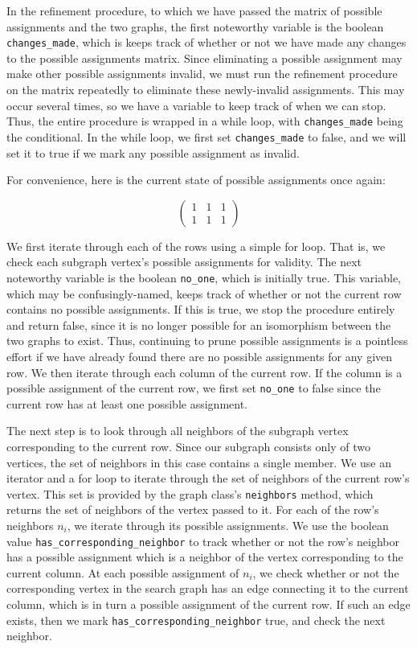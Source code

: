 \documentclass{article}
\begin{document}
  In the refinement procedure, to which we have passed the matrix of possible assignments and the two graphs, the first noteworthy variable is the boolean \texttt{changes\_made}, which is keeps track of whether or not we have made any changes to the possible assignments matrix. Since eliminating a possible assignment may make other possible assignments invalid, we must run the refinement procedure on the matrix repeatedly to eliminate these newly-invalid assignments. This may occur several times, so we have a variable to keep track of when we can stop. Thus, the entire procedure is wrapped in a while loop, with \texttt{changes\_made} being the conditional. In the while loop, we first set \texttt{changes\_made} to false, and we will set it to true if we mark any possible assignment as invalid.

  For convenience, here is the current state of possible assignments once again:

  \[ \begin{pmatrix}
      1 & 1 & 1 \\
      1 & 1 & 1
  \end{pmatrix} \]

  We first iterate through each of the rows using a simple for loop. That is, we check each subgraph vertex's possible assignments for validity. The next noteworthy variable is the boolean \texttt{no\_one}, which is initially true. This variable, which may be confusingly-named, keeps track of whether or not the current row contains no possible assignments. If this is true, we stop the procedure entirely and return false, since it is no longer possible for an isomorphism between the two graphs to exist. Thus, continuing to prune possible assignments is a pointless effort if we have already found there are no possible assignments for any given row. We then iterate through each column of the current row. If the column is a possible assignment of the current row, we first set \texttt{no\_one} to false since the current row has at least one possible assignment.

  The next step is to look through all neighbors of the subgraph vertex corresponding to the current row. Since our subgraph consists only of two vertices, the set of neighbors in this case contains a single member. We use an iterator and a for loop to iterate through the set of neighbors of the current row's vertex. This set is provided by the graph class's \texttt{neighbors} method, which returns the set of neighbors of the vertex passed to it. For each of the row's neighbors $n_i$, we iterate through its possible assignments. We use the boolean value \texttt{has\_corresponding\_neighbor} to track whether or not the row's neighbor has a possible assignment which is a neighbor of the vertex corresponding to the current column. At each possible assignment of $n_i$, we check whether or not the corresponding vertex in the search graph has an edge connecting it to the current column, which is in turn a possible assignment of the current row. If such an edge exists, then we mark \texttt{has\_corresponding\_neighbor} true, and check the next neighbor.
\end{document}
